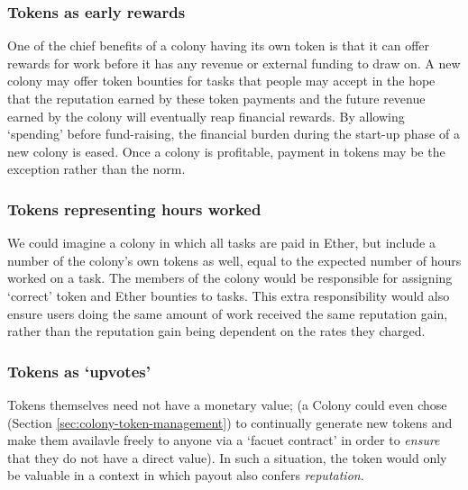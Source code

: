 \subsubsection*{Tokens as early rewards}
One of the chief benefits of a colony having its own token is that it can offer rewards for work before it has any revenue or external funding to draw on.
A new colony may offer token bounties for tasks that people may accept in the hope that the reputation earned by these token payments and the future revenue earned by the colony will eventually reap financial rewards. By allowing `spending' before fund-raising, the financial burden during the start-up phase of a new colony is eased. Once a colony is profitable, payment in tokens may be the exception rather than the norm.

\subsubsection*{Tokens representing hours worked}
We could imagine a colony in which all tasks are paid in Ether, but include a number of the colony's own tokens as well, equal to the expected number of hours worked on a task. The members of the colony would be responsible for assigning `correct' token and Ether bounties to tasks. This extra responsibility would also ensure users doing the same amount of work received the same reputation gain, rather than the reputation gain being dependent on the rates they charged.

\subsubsection*{Tokens as `upvotes'}
Tokens themselves need not have a monetary value; (a Colony could even chose (Section \ref{sec:colony-token-management}) to continually generate new tokens and make them availavle freely to anyone via a `facuet contract' in order to \emph{ensure} that they do not have a direct value). In such a situation, the token would only be valuable in a context in which payout also confers \emph{reputation}.
